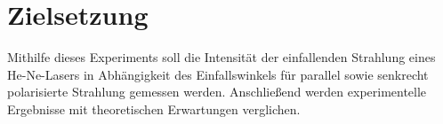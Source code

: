 \section{Zielsetzung}
\label{sec:Zielsetzung}

Mithilfe dieses Experiments soll die Intensität der einfallenden Strahlung eines 
He-Ne-Lasers in Abhängigkeit des Einfallswinkels für parallel sowie senkrecht 
polarisierte Strahlung gemessen werden. Anschließend werden experimentelle 
Ergebnisse mit theoretischen Erwartungen verglichen.